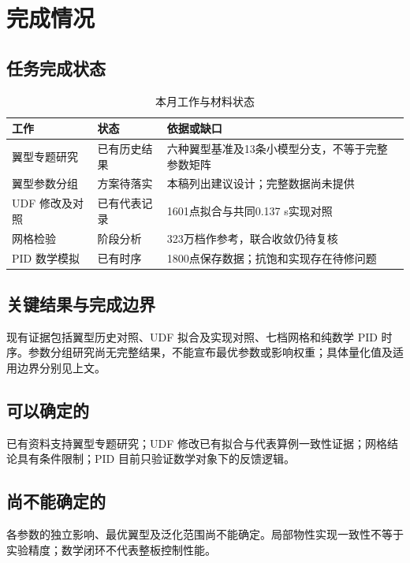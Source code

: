 \documentclass[stage2,fontset=fandol]{ydzjreport}
\begin{document}
\FloatBarrier

\section{完成情况}

\subsection{任务完成状态}

\begin{table}[H]\centering
\caption{本月工作与材料状态}\label{tab:tasks}
\begin{tabularx}{\textwidth}{@{}Y Y Y@{}}
\toprule
{} 工作 & 状态 & 依据或缺口 \\
\midrule
翼型专题研究 & 已有历史结果 & 六种翼型基准及13条小模型分支，不等于完整参数矩阵 \\
翼型参数分组 & 方案待落实 & 本稿列出建议设计；完整数据尚未提供 \\
UDF 修改及对照 & 已有代表记录 & 1601点拟合与共同0.137 s实现对照 \\
网格检验 & 阶段分析 & 323万档作参考，联合收敛仍待复核 \\
PID 数学模拟 & 已有时序 & 1800点保存数据；抗饱和实现存在待修问题 \\
\bottomrule\end{tabularx}\end{table}

\subsection{关键结果与完成边界}

现有证据包括翼型历史对照、UDF 拟合及实现对照、七档网格和纯数学 PID 时序。参数分组研究尚无完整结果，不能宣布最优参数或影响权重；具体量化值及适用边界分别见上文。



\subsection{可以确定的}

已有资料支持翼型专题研究；UDF 修改已有拟合与代表算例一致性证据；网格结论具有条件限制；PID 目前只验证数学对象下的反馈逻辑。

\subsection{尚不能确定的}

各参数的独立影响、最优翼型及泛化范围尚不能确定。局部物性实现一致性不等于实验精度；数学闭环不代表整板控制性能。
\end{document}
